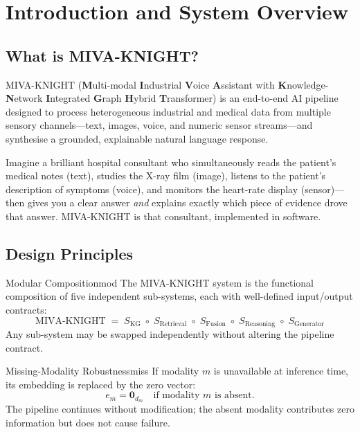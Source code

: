 \documentclass[12pt,a4paper]{article}
\newenvironment{plainbox}[1]{%
  \begin{tcolorbox}[myplain,title={#1}]
}{%
  \end{tcolorbox}
}
\begin{document}
\tableofcontents
\clearpage

\section{Introduction and System Overview}

\subsection{What is MIVA-KNIGHT?}

MIVA-KNIGHT (\textbf{M}ulti-modal \textbf{I}ndustrial \textbf{V}oice \textbf{A}ssistant with
\textbf{K}nowledge-\textbf{N}etwork \textbf{I}ntegrated \textbf{G}raph \textbf{H}ybrid
\textbf{T}ransformer) is an end-to-end AI pipeline designed to process heterogeneous
industrial and medical data from multiple sensory channels---text, images, voice, and
numeric sensor streams---and synthesise a grounded, explainable natural language response.

\begin{plainbox}{In Plain English}
Imagine a brilliant hospital consultant who simultaneously reads the patient's medical
notes (text), studies the X-ray film (image), listens to the patient's description of
symptoms (voice), and monitors the heart-rate display (sensor)---then gives you a
clear answer \emph{and} explains exactly which piece of evidence drove that answer.
MIVA-KNIGHT is that consultant, implemented in software.
\end{plainbox}

\subsection{Design Principles}

\begin{axiom}{Modular Composition}{mod}
The MIVA-KNIGHT system is the functional composition of five independent sub-systems,
each with well-defined input/output contracts:
\[
  \text{MIVA-KNIGHT} \;=\; S_{\text{KG}} \;\circ\; S_{\text{Retrieval}}
  \;\circ\; S_{\text{Fusion}} \;\circ\; S_{\text{Reasoning}}
  \;\circ\; S_{\text{Generator}}
\]
Any sub-system may be swapped independently without altering the pipeline contract.
\end{axiom}

\begin{axiom}{Missing-Modality Robustness}{miss}
If modality $m$ is unavailable at inference time, its embedding is replaced by the
zero vector:
\[
  e_m = \mathbf{0}_{d_m} \quad \text{if modality } m \text{ is absent.}
\]
The pipeline continues without modification; the absent modality contributes zero
information but does not cause failure.
\end{axiom}
\end{document}
